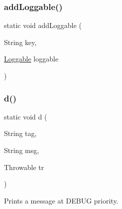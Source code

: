 \subsubsection{\texorpdfstring{add\+Loggable()}{addLoggable()}}
{\footnotesize\ttfamily static void add\+Loggable (\begin{DoxyParamCaption}\item[{String}]{key,  }\item[{\hyperlink{interfacecom_1_1toast_1_1android_1_1gamebase_1_1base_1_1log_1_1_loggable}{Loggable}}]{loggable }\end{DoxyParamCaption})\hspace{0.3cm}{\ttfamily [static]}}

\mbox{\label{classcom_1_1toast_1_1android_1_1gamebase_1_1base_1_1log_1_1_logger_ac92000722506d61f323e53319c3d75b0}} 
\subsubsection{\texorpdfstring{d()}{d()}\hspace{0.1cm}{\footnotesize\ttfamily [1/2]}}
{\footnotesize\ttfamily static void d (\begin{DoxyParamCaption}\item[{String}]{tag,  }\item[{String}]{msg,  }\item[{Throwable}]{tr }\end{DoxyParamCaption})\hspace{0.3cm}{\ttfamily [static]}}



Prints a message at D\+E\+B\+UG priority. 


